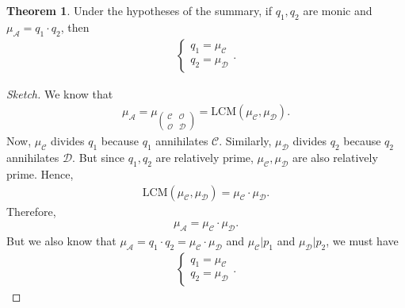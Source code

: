 \documentclass{article}
\theoremstyle{definition}
\newtheorem{thm}{Theorem}[section]
\newcommand{\A}{\mathcal{A}}
\begin{document}
\begin{thm}
	Under the hypotheses of the summary, if $q_1, q_2$ are monic and $\mu_\A= q_1 \cdot q_2$, then 
	\begin{align*}
	\begin{cases}
	q_1 = \mu_\mathcal{C}\\
	q_2 = \mu_\mathcal{D}
	\end{cases}.
	\end{align*}
	
	\begin{proof}[Sketch]
		We know that \begin{align*}
		\mu_\A = \mu_{\begin{pmatrix}
			\mathcal{C} & \mathcal{O}\\
			\mathcal{O} & \mathcal{D}
			\end{pmatrix}} = \text{LCM}(\mu_\mathcal{C} , \mu_\mathcal{D}).
		\end{align*}
		Now, $\mu_\mathcal{C}$ divides $q_1$ because $q_1$ annihilates $\mathcal{C}$. Similarly, $\mu_\mathcal{D}$ divides $q_2$ because $q_2$ annihilates $\mathcal{D}$. But since $q_1, q_2$ are relatively prime, $\mu_\mathcal{C}, \mu_\mathcal{D}$ are also relatively prime. Hence,
		\begin{align*}
		\text{LCM}(\mu_\mathcal{C}, \mu_\mathcal{D}) = \mu_\mathcal{C} \cdot \mu_\mathcal{D}.
		\end{align*}
		Therefore,
		\begin{align*}
		\mu_\A = \mu_\mathcal{C} \cdot \mu_\mathcal{D}.
		\end{align*}
		But we also know that $\mu_\A = q_1 \cdot q_2 = \mu_\mathcal{C} \cdot \mu_\mathcal{D}$ and $\mu_\mathcal{C}\big\vert p_1$ and $\mu_\mathcal{D}\big\vert p_2$, we must have
		\begin{align*}
		\begin{cases}
		q_1 = \mu_\mathcal{C}\\
		q_2 = \mu_\mathcal{D}
		\end{cases}.
		\end{align*}
	\end{proof}
\end{thm}
\end{document}
